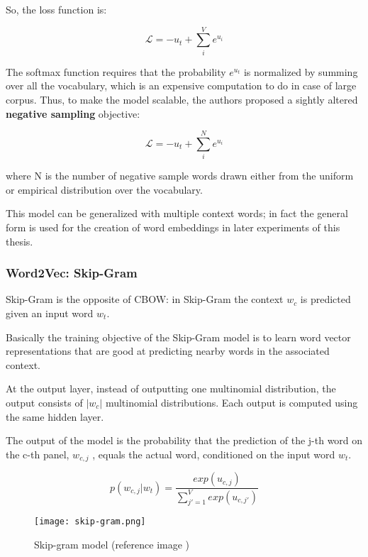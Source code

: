 So, the loss function is:

\begin{equation}
\mathcal{L} = - u_t + \sum_i^V e^{u_i}
\end{equation}

The softmax function requires that the probability $e^{u_t}$ is normalized by summing over all the vocabulary, which is an expensive computation to do in case of large corpus. Thus, to make the model scalable, the authors proposed a sightly altered \textbf{negative sampling} objective:

\begin{equation}
\mathcal{L} = - u_t + \sum_i^N e^{u_i}
\end{equation}

where N is the number of negative sample words drawn either from the uniform or empirical distribution over the vocabulary.

This model can be generalized with multiple context words; in fact the general form is used for the creation of word embeddings in later experiments of this thesis.

\subsubsection{Word2Vec: Skip-Gram}

Skip-Gram is the opposite of CBOW: in Skip-Gram the context $w_c$ is predicted given an input word $w_t$.

Basically the training objective of the Skip-Gram model is to learn word
vector representations that are good at predicting nearby words in the
associated context.

At the output layer, instead of outputting one multinomial distribution,
the output consists of $|w_c|$ multinomial distributions. Each output is computed using the same hidden layer.

The output of the model is the probability that the prediction of the j-th word on
the c-th panel, $w_{c,j}$ , equals the actual word, conditioned on the input word $w_t$.

\begin{equation}
p(w_{c, j} | w_t) = \frac{exp(u_{c, j})}{\sum_{j' = 1}^V exp(u_{c,j'})}
\end{equation}

\begin{figure}[H]
  \centering
  \texttt{[image: skip-gram.png]}
  \caption{Skip-gram model (reference image \cite{w2ve})}
  \label{fig:skip-gram}
\end{figure}

